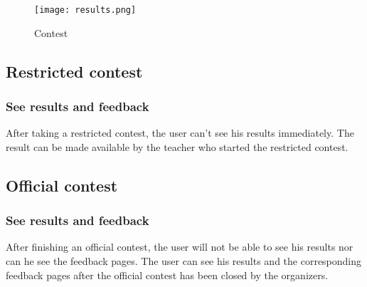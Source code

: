 		\begin{figure}[h]
		  \centering
			\texttt{[image: results.png]}
		  \caption{Contest}
		  \label{Contest}
		\end{figure}

\subsection{Restricted contest}

\subsubsection{See results and feedback}
After taking a restricted contest, the user can't see his results immediately. The result can be made available by the teacher who started the restricted contest. 

\subsection{Official contest}

\subsubsection{See results and feedback}
After finishing an official contest, the user will not be able to see his results nor can he see the feedback pages. The user can see his results and the corresponding feedback pages after the official contest has been closed by the organizers. 

